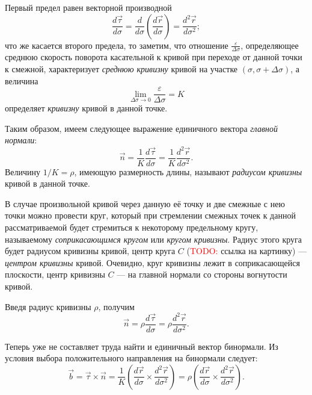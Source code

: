 \documentclass{article}
\theoremstyle{definition}
\theoremstyle{plain}
\theoremstyle{remark}
\numberwithin{equation}{section}
\newcommand{\paren}[1]{\left( #1 \right)}
\newcommand{\crossprod}[2]{#1 \times #2}
\newcommand{\der}[2][]{\frac{d #1}{d #2}}
\newcommand{\sder}[2][]{\frac{d^2 #1}{d #2^2}}
\begin{document}
Первый предел равен векторной производной
\begin{equation*}
  \der[\vec{\tau}]{\sigma} = \der{\sigma} \paren{\der[\vec{r}]{\sigma}} =
    \sder[\vec{r}]{\sigma};
\end{equation*}
что же касается второго предела, то заметим, что отношение
$\frac{\varepsilon}{\Delta \sigma}$, определяющее среднюю скорость поворота
касательной к кривой при переходе от данной точки к смежной, характеризует
\textit{среднюю кривизну} кривой на участке $(\sigma, \sigma + \Delta \sigma)$,
а величина
\begin{equation}
  \lim_{\Delta \sigma \to 0} \frac{\varepsilon}{\Delta \sigma} = K
\end{equation}
определяет \textit{кривизну} кривой в данной точке.

Таким образом, имеем следующее выражение единичного вектора \textit{главной
нормали}:
\begin{equation}
  \label{eq:main_norm}
  \vec{n} = \frac{1}{K} \der[\vec{\tau}]{\sigma} = \frac{1}{K}
    \sder[\vec{r}]{\sigma}.
\end{equation}
Величину $1/K = \rho$, имеющую размерность длины, называют \textit{радиусом
кривизны} кривой в данной точке.

В случае произвольной кривой через данную её точку и две смежные с нею точки
можно провести круг, который при стремлении смежных точек к данной
рассматриваемой будет стремиться к некоторому предельному кругу, называемому 
\textit{соприкасающимся кругом} или \textit{кругом кривизны}. Радиус этого круга
будет радиусом кривизны кривой, центр круга $C$ (\textcolor{red}{TODO:} ссылка
на картинку) --- \textit{центром кривизны} кривой. Очевидно, круг кривизны лежит
в соприкасающейся плоскости, центр кривизны $C$ --- на главной нормали со
стороны вогнутости кривой.

Введя радиус кривизны $\rho$, получим
\begin{equation}
  \vec{n} = \rho \der[\vec{\tau}]{\sigma} = \rho \sder[\vec{r}]{\sigma}.
\end{equation}

Теперь уже не составляет труда найти и единичный вектор бинормали. Из условия
выбора положительного направления на бинормали следует:
\begin{equation}
  \vec{b} = \crossprod{\vec{\tau}}{\vec{n}} = \frac{1}{K}
  \paren{\crossprod{\der[\vec{r}]{\sigma}}{\sder[\vec{r}]{\sigma}}} = \rho
  \paren{\crossprod{\der[\vec{r}]{\sigma}}{\sder[\vec{r}]{\sigma}}}.
\end{equation}
\end{document}
